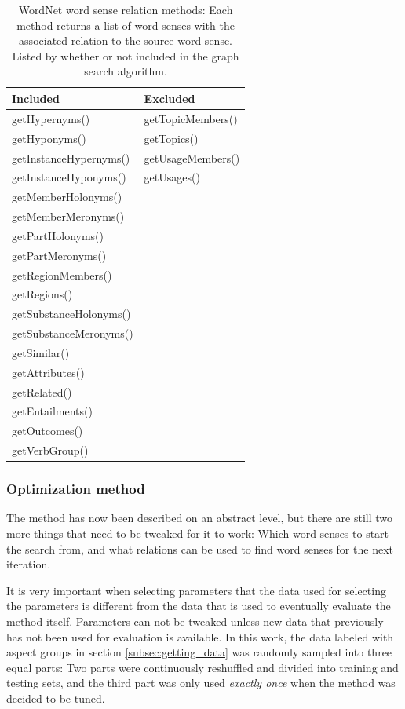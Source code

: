 \documentclass[a4paper,11pt]{kth-mag}
\begin{document}
\begin{table}[b]
  \centering
  \begin{tabular}{| l | l |}
    \hline
    \textbf{Included} & \textbf{Excluded} \\ \hline
    getHypernyms() & getTopicMembers() \\
    getHyponyms() & getTopics() \\
    getInstanceHypernyms() & getUsageMembers() \\
    getInstanceHyponyms() & getUsages() \\
    getMemberHolonyms() & \\
    getMemberMeronyms() & \\
    getPartHolonyms() & \\
    getPartMeronyms() & \\
    getRegionMembers() & \\
    getRegions() & \\
    getSubstanceHolonyms() & \\
    getSubstanceMeronyms() & \\
    getSimilar() & \\
    getAttributes() & \\
    getRelated() & \\
    getEntailments() & \\
    getOutcomes() & \\
    getVerbGroup() & \\
    \hline
  \end{tabular}
  \caption{WordNet\cite{wordnet} word sense relation methods: Each method returns a list of word senses with the
    associated relation to the source word sense. Listed by whether or not included in the graph search algorithm.}
  \label{tab:bfs_relation}
\end{table}


\subsubsection{Optimization method}
The method has now been described on an abstract level, but there are still two more things that need to be tweaked for it to work: Which word senses to start the search from, and what relations can be used to find word senses for the next iteration.

It is very important when selecting parameters that the data used for selecting the parameters is different from the data that is used to eventually evaluate the method itself. Parameters can not be tweaked unless new data that previously has not been used for evaluation is available. In this work, the data labeled with aspect groups in section \ref{subsec:getting_data} was randomly sampled into three equal parts: Two parts were continuously reshuffled and divided into training and testing sets, and the third part was only used \emph{exactly once} when the method was decided to be tuned.
\end{document}
